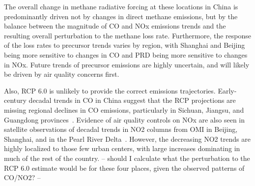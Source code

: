 
The overall change in methane radiative forcing at these locations in China is predominantly driven not by changes in direct methane emissions, but by the balance between the magnitude of CO and NOx emissions trends and the resulting overall perturbation to the methane loss rate. Furthermore, the response of the loss rates to precursor trends varies by region, with Shanghai and Beijing being more sensitive to changes in CO and PRD being more sensitive to changes in NOx. Future trends of precursor emissions are highly uncertain, and will likely be driven by air quality concerns first.

Also, RCP 6.0 is unlikely to provide the correct emissions trajectories. Early-century decadal trends in CO in China suggest that the RCP projections are missing regional declines in CO emissions, particularly in Sichuan, Jiangsu, and Guangdong provinces~\citep{ref:zhao2012}. Evidence of air quality controls on NOx are also seen in satellite observations of decadal trends in NO2 columns from OMI in Beijing, Shanghai, and in the Pearl River Delta~\citep{ref:duncan2016}. However, the decreasing NO2 trends are highly localized to those few urban centers, with large increases dominating in much of the rest of the country. -- should I calculate what the perturbation to the RCP 6.0 estimate would be for these four places, given the observed patterns of CO/NO2? --

